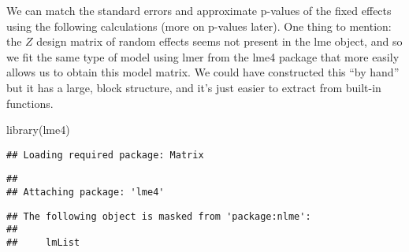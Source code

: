 \documentclass[
]{book}
\newenvironment{Shaded}{\begin{snugshade}}{\end{snugshade}}
\newcommand{\FunctionTok}[1]{\textcolor[rgb]{0.00,0.00,0.00}{#1}}
\newcommand{\NormalTok}[1]{#1}
\begin{document}
We can match the standard errors and approximate p-values of the fixed effects using the following calculations (more on p-values later). One thing to mention: the \(Z\) design matrix of random effects seems not present in the lme object, and so we fit the same type of model using lmer from the lme4 package that more easily allows us to obtain this model matrix. We could have constructed this ``by hand'' but it has a large, block structure, and it's just easier to extract from built-in functions.

\begin{Shaded}
\begin{Highlighting}[]
\FunctionTok{library}\NormalTok{(lme4)}
\end{Highlighting}
\end{Shaded}

\begin{verbatim}
## Loading required package: Matrix
\end{verbatim}

\begin{verbatim}
## 
## Attaching package: 'lme4'
\end{verbatim}

\begin{verbatim}
## The following object is masked from 'package:nlme':
## 
##     lmList
\end{verbatim}
\end{document}
